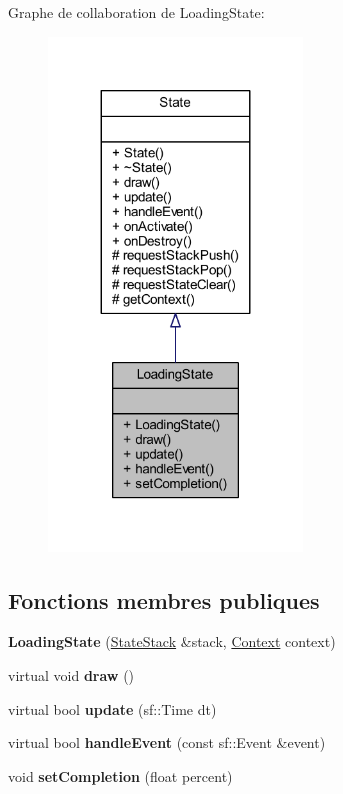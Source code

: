 Graphe de collaboration de Loading\+State\+:\nopagebreak
\begin{figure}[H]
\begin{center}
\leavevmode
\includegraphics[width=191pt]{class_loading_state__coll__graph}
\end{center}
\end{figure}
\subsection*{Fonctions membres publiques}
\begin{DoxyCompactItemize}
\item 
\hypertarget{class_loading_state_a6830cacada1f9c215f913d31aa1805cf}{}\label{class_loading_state_a6830cacada1f9c215f913d31aa1805cf} 
{\bfseries Loading\+State} (\hyperlink{class_state_stack}{State\+Stack} \&stack, \hyperlink{struct_state_1_1_context}{Context} context)
\item 
\hypertarget{class_loading_state_adfe2c002c52cc2c49967ba3ace4aa73b}{}\label{class_loading_state_adfe2c002c52cc2c49967ba3ace4aa73b} 
virtual void {\bfseries draw} ()
\item 
\hypertarget{class_loading_state_a8f2f50523c1f35e011ddd0839aa66ee4}{}\label{class_loading_state_a8f2f50523c1f35e011ddd0839aa66ee4} 
virtual bool {\bfseries update} (sf\+::\+Time dt)
\item 
\hypertarget{class_loading_state_a37da243eeeca36460bac2f32cef3e368}{}\label{class_loading_state_a37da243eeeca36460bac2f32cef3e368} 
virtual bool {\bfseries handle\+Event} (const sf\+::\+Event \&event)
\item 
\hypertarget{class_loading_state_a28bee93e7f9818084af8be6b31ee0ba4}{}\label{class_loading_state_a28bee93e7f9818084af8be6b31ee0ba4} 
void {\bfseries set\+Completion} (float percent)
\end{DoxyCompactItemize}
